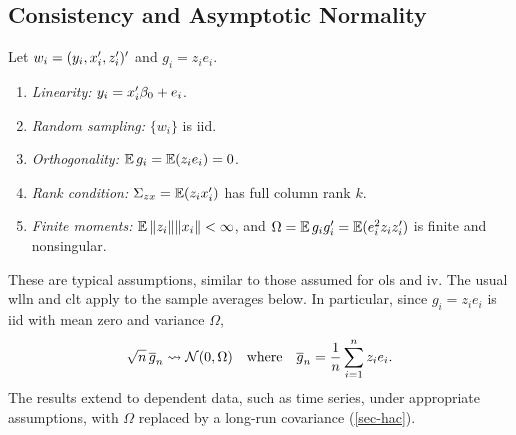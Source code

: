 \documentclass[a4paper,12pt]{article}
\begin{document}
\subsection{Consistency and Asymptotic Normality}

\begin{assumption}\label{ass-linear}
	Let $w_i=(y_i,x_i^{\prime},z_i^{\prime})^{\prime}$ and $g_i=z_ie_i$.
	\begin{enumerate}
		\item \emph{Linearity:} $y_i=x_i^{\prime}\beta_0+e_i$.
		\item \emph{Random sampling:} $\{w_i\}$ is \gls{iid}.
		\item \emph{Orthogonality:} $\operatorname{\mathbb{E}} g_i=\operatorname{\mathbb{E}}(z_ie_i)=0$.
		\item \emph{Rank condition:} $\Sigma_{zx}=\operatorname{\mathbb{E}}(z_ix_i^{\prime})$ has full column rank $k$.
		\item \emph{Finite moments:} $\operatorname{\mathbb{E}}\|z_i\|\|x_i\|<\infty$,
		and $\Omega=\operatorname{\mathbb{E}} g_ig_i^{\prime}=\operatorname{\mathbb{E}}(e_i^2z_iz_i^{\prime})$ is finite and nonsingular.
	\end{enumerate}
\end{assumption}

\begin{remark}
	These are typical assumptions,
	similar to those assumed for \gls{ols} and \gls{iv}.
	The usual \gls{wlln} and \gls{clt} apply to the sample averages below.
	In particular, since $g_i=z_ie_i$ is \gls{iid} with mean zero and variance $\Omega$,
	\begin{align}\label{eq-moment-clt}
		\sqrt n\,\overline g_n\overset{}{\leadsto}\operatorname{\mathcal{N}}(0,\Omega)
		\quad\text{where}\quad
		\overline g_n=\frac1n\sum_{i=1}^nz_ie_i.
	\end{align}
	The results extend to dependent data, such as time series, under appropriate assumptions,
	with $\Omega$ replaced by a long-run covariance (\autoref{sec-hac}).
\end{remark}
\end{document}
